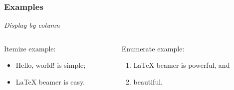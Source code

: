 \documentclass{beamer}
\begin{document}
\begin{frame}\frametitle{Examples}
  \emph{Display by column}
  \begin{columns}
    \begin{column}{.5\textwidth}
      \begin{example}
        Itemize example:
        \begin{itemize}
        \item Hello, world! is simple;
        \item \LaTeX{} beamer is easy.
        \end{itemize}
      \end{example}
    \end{column}
    \begin{column}{.5\textwidth}
      \begin{exampleblock}{Enumerate example:}
        \begin{enumerate}
        \item \LaTeX{} beamer is powerful, and
        \item beautiful.
        \end{enumerate}
      \end{exampleblock}
    \end{column}
  \end{columns}
\end{frame}
\end{document}
